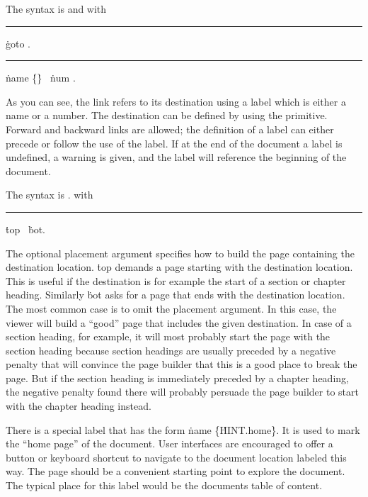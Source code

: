 The syntax is 
  
and
with

\medskip
{}
\rule {}:\.{goto} .
\rule {}:
  \.{name} \.{\{}\.{\}} \OR\ \.{num} .
\medskip

As you can see, the link refers to its destination using a label
which is either a name or a number.
The destination can be defined by using the 
 primitive.
Forward and backward links are allowed; the definition of a label can either
precede or follow the use of the label. If at the end of the document a label
is undefined, a warning is given, and the label will reference the beginning of the
document.

The syntax is
\medskip
\prim{}  .
\medskip
with
\medskip
{}
\rule{}:
\.{top} \OR\ \.{bot}.
\medskip

The optional placement argument specifies how to build the page 
containing the destination location. \.{top} demands
a page starting with the destination location. This is useful
if the destination is for example the start of a section or chapter heading.
Similarly \.{bot} asks for a page that ends with the destination location.
The most common case is to omit the placement argument. In this case, the
viewer will build a ``good'' page that includes the given destination.
In case of a section heading, for example, it will most probably start the
page with the section heading because section headings are usually preceded
by a negative penalty that will convince the page builder that this is a good
place to break the page. But if the section heading is immediately preceded
by a chapter heading, the negative penalty found there will probably
persuade the page builder to start with the chapter heading instead.

There is a special label that has the form
\.{name} \.{\{}\.{HINT.home}\.{\}}.
It is used to mark the ``home page'' of the document. User interfaces
are encouraged to offer a button or keyboard shortcut to navigate to the
document location labeled this way. The page should be a convenient
starting point to explore the document. The typical place for this label
would be the documents table of content.

